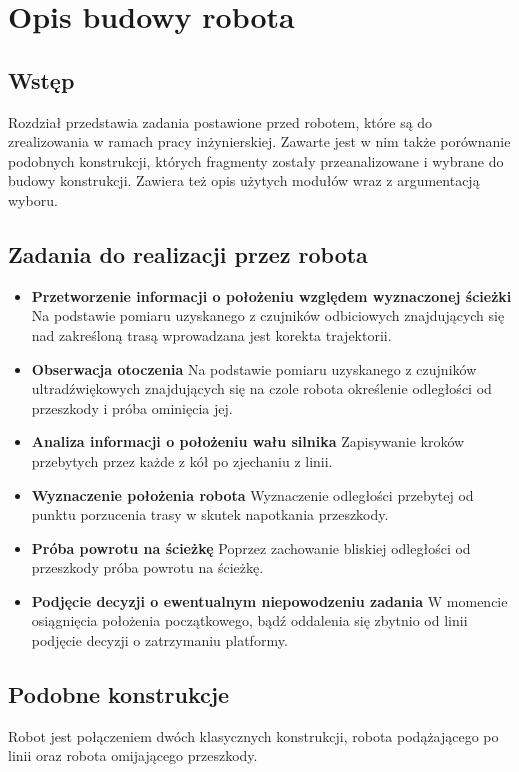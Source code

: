 \chapter{Opis budowy robota}
\section{Wstęp}
Rozdział przedstawia zadania postawione przed robotem, które są do zrealizowania w ramach pracy inżynierskiej. Zawarte jest w nim także porównanie podobnych konstrukcji, których fragmenty zostały przeanalizowane i wybrane do budowy konstrukcji. Zawiera też opis użytych modułów wraz z argumentacją wyboru.
\section{Zadania do realizacji przez robota}
\begin{itemize}
    \item \textbf{Przetworzenie informacji o położeniu względem wyznaczonej ścieżki}
    Na podstawie pomiaru uzyskanego z czujników odbiciowych znajdujących się nad zakreśloną trasą wprowadzana jest korekta trajektorii.
    \item \textbf{Obserwacja otoczenia}
    Na podstawie pomiaru uzyskanego z czujników ultradźwiękowych znajdujących się na czole robota określenie odległości od przeszkody i próba ominięcia jej.
    \item \textbf{Analiza informacji o położeniu wału silnika}
    Zapisywanie kroków przebytych przez każde z kół po zjechaniu z linii.
    \item \textbf{Wyznaczenie położenia robota}
    Wyznaczenie odległości przebytej od punktu porzucenia trasy w skutek napotkania przeszkody.
    \item \textbf{Próba powrotu na ścieżkę }
    Poprzez zachowanie bliskiej odległości od przeszkody próba powrotu na ścieżkę.
    \item \textbf{Podjęcie decyzji o ewentualnym niepowodzeniu zadania}
    W momencie osiągnięcia położenia początkowego, bądź oddalenia się zbytnio od linii podjęcie decyzji o zatrzymaniu platformy.
\end{itemize}

\section{Podobne konstrukcje}
Robot jest połączeniem dwóch klasycznych konstrukcji, robota podążającego po linii oraz robota omijającego przeszkody.

